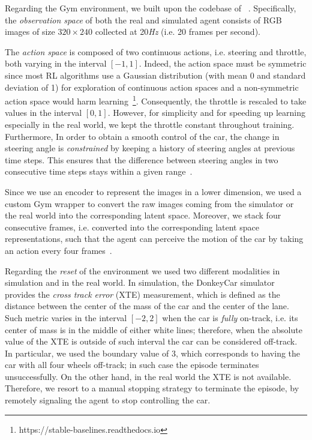 Regarding the Gym environment, we built upon the codebase of ~\cite{learning-to-drive-in-5-minutes}. Specifically, the \textit{observation space} of both the real and simulated agent consists of RGB images of size $320 \times 240$ collected at 20\textit{Hz} (i.e. 20 frames per second). 

The \textit{action space} is composed of two continuous actions, i.e. steering and throttle, both varying in the interval $[-1, 1]$. Indeed, the action space must be symmetric since most RL algorithms use a Gaussian distribution (with mean 0 and standard deviation of 1) for exploration of continuous action spaces and a non-symmetric action space would harm learning~\footnote{https://stable-baselines.readthedocs.io}. Consequently, the throttle is rescaled to take values in the interval $[0, 1]$. However, for simplicity and for speeding up learning especially in the real world, we kept the throttle constant throughout training. Furthermore, In order to obtain a smooth control of the car, the change in steering angle is \textit{constrained} by keeping a history of steering angles at previous time steps. This ensures that the difference between steering angles in two consecutive time steps stays within a given range~\cite{learning-to-drive-in-5-minutes}.

Since we use an encoder to represent the images in a lower dimension, we used a custom Gym wrapper to convert the raw images coming from the simulator or the real world into the corresponding latent space. Moreover, we stack four consecutive frames, i.e. converted into the corresponding latent space representations, such that the agent can perceive the motion of the car by taking an action every four frames~\cite{dqn}.

Regarding the \textit{reset} of the environment we used two different modalities in simulation and in the real world. In simulation, the DonkeyCar simulator provides the \textit{cross track error} (XTE) measurement, which is defined as the distance between the center of the mass of the car and the center of the lane. Such metric varies in the interval $[-2, 2]$ when the car is \textit{fully} on-track, i.e. its center of mass is in the middle of either white lines; therefore, when the absolute value of the XTE is outside of such interval the car can be considered off-track. In particular, we used the boundary value of $3$, which corresponds to having the car with all four wheels off-track; in such case the episode terminates unsuccessfully. On the other hand, in the real world the XTE is not available. Therefore, we resort to a manual stopping strategy to terminate the episode, by remotely signaling the agent to stop controlling the car.


